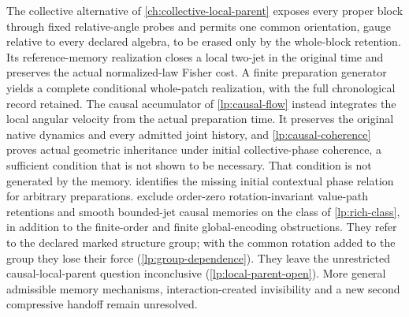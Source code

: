 The collective alternative of \cref{ch:collective-local-parent} exposes every proper block through fixed relative-angle probes and permits one common orientation, gauge relative to every declared algebra, to be erased only by the whole-block retention. Its reference-memory realization closes a local two-jet in the original time and preserves the actual normalized-law Fisher cost. A finite preparation generator yields a complete conditional whole-patch realization, with the full chronological record retained. The causal accumulator of \cref{lp:causal-flow} instead integrates the local angular velocity from the actual preparation time. It preserves the original native dynamics and every admitted joint history, and \cref{lp:causal-coherence} proves actual geometric inheritance under initial collective-phase coherence, a sufficient condition that is not shown to be necessary. That condition is not generated by the memory.  identifies the missing initial contextual phase relation for arbitrary preparations.  exclude order-zero rotation-invariant value-path retentions and smooth bounded-jet causal memories on the class of \cref{lp:rich-class}, in addition to the finite-order and finite global-encoding obstructions. They refer to the declared marked structure group; with the common rotation added to the group they lose their force (\cref{lp:group-dependence}). They leave the unrestricted causal-local-parent question inconclusive (\cref{lp:local-parent-open}). More general admissible memory mechanisms, interaction-created invisibility and a new second compressive handoff remain unresolved.

